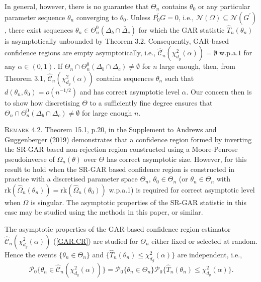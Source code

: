 \documentclass[hidelinks, 11 pt, a4paper, pdflatex]{article}
\begin{document}
{  In general, however, there is no guarantee that $\Theta_{n}$ contains $\theta_0$ or any particular parameter sequence $\theta_{n}$ converging to $\theta_0$. Unless $P_{0}^{\prime}G = 0$, i.e., $\mathcal{N}(\Omega) \subseteq \mathcal{N}(G^{\prime})$, there exist sequences $\theta_n \in \Theta _{n}^{0}(\Delta_{b} \cap \bar{\Delta}_{c})$ for which the GAR statistic $\hat{T}_{n}(\theta_{n})$ is asymptotically unbounded by Theorem 3.2. Consequently, GAR-based confidence regions are empty asymptotically, i.e., $\hat{\mathcal{C}}_{n}(\chi_{d_{g}}^{2}(\alpha)) = \emptyset$ w.p.a.$1$ for any $\alpha \in (0,1)$. If $\Theta_{n} \cap \Theta_{n}^{0}(\Delta_{b} \cap \Delta_{c}) \neq \emptyset$ for $n$ large enough, then, from Theorem 3.1, $\hat{\mathcal{C}}_{n}(\chi_{d_{g}}^{2}(\alpha))$ contains sequences $\theta_{n}$ such that $d(\theta_{n},\theta_{0}) = o(n^{-1/2})$ and has correct asymptotic level $\alpha$. Our concern then is to show how discretising $\Theta$ to a sufficiently fine degree ensures that $\Theta_{n} \cap \Theta_{n}^{0}(\Delta_{b} \cap \Delta_{c}) \neq \emptyset$ for large enough $n$.

   \textsc{Remark 4.2}. Theorem 15.1, p.20, in the Supplement to Andrews and Guggenberger (2019) demonstrates that a confidence region formed 
    by inverting the SR-GAR based non-rejection region constructed using a Moore-Penrose pseudoinverse of $\Omega_{n}(\theta)$ over $\Theta$ has correct asymptotic size. However, for this result to hold when the SR-GAR based confidence region is constructed in practice with a discretised parameter space $\Theta_{n}$, $\theta_0 \in \Theta_{n}$ (or $\theta_{n} \in \Theta_{n}$ with $\mathrm{rk}(\hat{\Omega}_{n}(\theta_{n})) = \mathrm{rk}(\hat{\Omega}_{n}(\theta_0))$ w.p.a.1) is required for correct asymptotic level when $\Omega$ is singular. The asymptotic properties of the SR-GAR statistic in this case may be studied using the methods in this paper, or similar.

  The asymptotic properties of the GAR-based confidence region estimator $\hat{\mathcal{C}}_{n}(\chi_{d_{g}}^{2}(\alpha))$ (\ref{GAR.CR}) are studied for $\Theta_{n}$ either fixed or selected at random. Hence the events $\{\theta_{n} \in \Theta_{n}\}$ and $\{\hat{T}_{n}(\theta_{n}) \leq \chi_{d_{g}}^{2}(\alpha)\}$ are independent, i.e.,
   \begin{equation} \label{GAR.CR.cov}
    \mathcal{P}_0 \{\theta_{n} \in \hat{\mathcal{C}}_{n}(\chi_{d_{g}}^{2}(\alpha))\} = \mathcal{P}_0 \{\theta_{n}\in \Theta_{n}\}\mathcal{P}_0 \{\hat{T}_{n}(\theta_{n}) \leq
     \chi_{d_{g}}^{2}(\alpha)\}.
   \end{equation}

}
\end{document}
